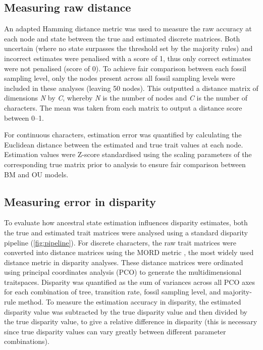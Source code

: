 \documentclass[titlepage]{article}
\begin{document}
\subsection{Measuring raw distance}
An adapted Hamming distance metric was used to measure the raw accuracy at each node and state between the true and estimated discrete matrices.
Both uncertain (where no state surpasses the threshold set by the majority rules) and incorrect estimates were penalised with a score of 1, thus only correct estimates were not penalised (score of 0).
To achieve fair comparison between each fossil sampling level, only the nodes present across all fossil sampling levels were included in these analyses (leaving 50 nodes).
This outputted a distance matrix of dimensions \textit{N} by \textit{C}, whereby \textit{N} is the number of nodes and \textit{C} is the number of characters.
The mean was taken from each matrix to output a distance score between 0--1.

For continuous characters, estimation error was quantified by calculating the Euclidean distance between the estimated and true trait values at each node. 
Estimation values were Z-score standardised using the scaling parameters of the corresponding true matrix prior to analysis to ensure fair comparison between BM and OU models.


\subsection{Measuring error in disparity}
To evaluate how ancestral state estimation influences disparity estimates, both the true and estimated trait matrices were analysed using a standard disparity pipeline (\autoref{fig:pipeline}).
For discrete characters, the raw trait matrices were converted into distance matrices using the MORD metric \citep{lloyd_estimating_2016}, the most widely used distance metric in disparity analyses.
These distance matrices were ordinated using principal coordinates analysis (PCO) to generate the multidimensional traitspaces.
Disparity was quantified as the sum of variances across all PCO axes for each combination of tree, transition rate, fossil sampling level, and majority-rule method.
To measure the estimation accuracy in disparity, the estimated disparity value was subtracted by the true disparity value and then divided by the true disparity value, to give a relative difference in disparity (this is necessary since true disparity values can vary greatly between different parameter combinations).
\end{document}
